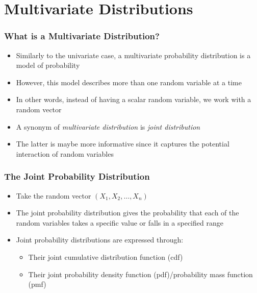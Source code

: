 \documentclass[10pt]{beamer}
\theoremstyle{definition}
\begin{document}
\section{Multivariate Distributions}
\begin{frame}[fragile]
\frametitle{What is a Multivariate Distribution?}
\begin{itemize}
	\item Similarly to the univariate case, a multivariate probability distribution is a model of probability

	\item However, this model describes more than one random variable at a time

	\item In other words, instead of having a scalar random variable, we work with a random vector

	\item A synonym of \textit{multivariate distribution} is \textit{joint distribution}

	\item The latter is maybe more informative since it captures the potential interaction of random variables
\end{itemize}
\end{frame} 

\begin{frame}[fragile]
\frametitle{The Joint Probability Distribution}
\begin{itemize}
	\item Take the random vector $(X_{1}, X_{2},\ldots, X_{n})$

	\item The joint probability distribution gives the probability that each of the random variables takes a specific value or falls in a specified range

	\item Joint probability distributions are expressed through:
	\begin{itemize}
		\item Their joint cumulative distribution function (cdf)
		\item Their joint probability density function (pdf)/probability mass function (pmf)
	\end{itemize}
\end{itemize}
\end{frame}
\end{document}
